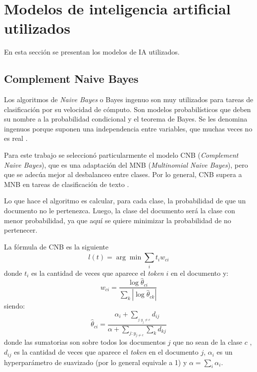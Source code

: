 \section{Modelos de inteligencia artificial utilizados}

En esta sección se presentan los modelos de IA utilizados.

\subsection{Complement Naive Bayes}

Los algoritmos de \textit{Naive Bayes} o Bayes ingenuo son muy utilizados para tareas de clasificación por su velocidad de cómputo. Son modelos probabilísticos que deben su nombre a la probabilidad condicional y el teorema de Bayes. Se les denomina ingenuos porque suponen una independencia entre variables, que muchas veces no es real \citep{WEBSITE:18}.

Para este trabajo se seleccionó particularmente el modelo CNB (\textit{Complement Naive Bayes}), que es una adaptación del MNB (\textit{Multinomial Naive Bayes}), pero que se adecúa mejor al desbalanceo entre clases. Por lo general, CNB supera a MNB en tareas de clasificación de texto \citep{ARTICLE:6}.

Lo que hace el algoritmo es calcular, para cada clase, la probabilidad de que un documento no le pertenezca. Luego, la clase del documento será la clase con menor probabilidad, ya que aquí se quiere minimizar la probabilidad de no pertenecer.

La fórmula de CNB es la siguiente \citep{WEBSITE:19}
\begin{equation}
l(t) = \arg \min \sum_{i}^{}t_{i}w_{ci}
\end{equation}
donde $t_{i}$ es la cantidad de veces que aparece el \textit{token} $i$ en el documento y:
\begin{equation}
w_{ci} = \frac{\log{\widehat{\theta}_{ci}}}{\sum_{k}^{}|\log{\widehat{\theta}_{ck}}|}
\end{equation}
siendo:
\begin{equation}
\label{eq:tita}
\widehat{\theta}_{ci} = \frac{\alpha_{i} + \sum_{_{j:y_{j}\neq c}}^{}d_{ij}}{\alpha+\sum_{j:y_{j\neq c}}^{}\sum_{k}^{}d_{kj}}
\end{equation}
donde las sumatorias son sobre todos los documentos $j$ que no sean de la clase $c$ , $d_{ij}$ es la cantidad de veces que aparece el \textit{token} en el documento $j$, $\alpha_{i}$ es un hyperparámetro de suavizado (por lo general equivale a 1) y $\alpha = \sum_{i}^{}\alpha_{i}$.
